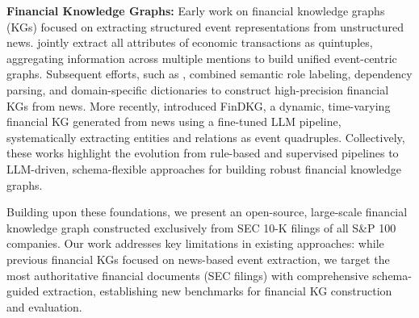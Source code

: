 \textbf{Financial Knowledge Graphs:}
Early work on financial knowledge graphs (KGs) focused on extracting structured event representations from unstructured news. \citet{benetka2017financial} jointly extract all attributes of economic transactions as quintuples, aggregating information across multiple mentions to build unified event-centric graphs. Subsequent efforts, such as \citet{elhammadi2020pipeline}, combined semantic role labeling, dependency parsing, and domain-specific dictionaries to construct high-precision financial KGs from news. More recently, \citet{li2024findkg} introduced FinDKG, a dynamic, time-varying financial KG generated from news using a fine-tuned LLM pipeline, systematically extracting entities and relations as event quadruples. Collectively, these works highlight the evolution from rule-based and supervised pipelines to LLM-driven, schema-flexible approaches for building robust financial knowledge graphs.

Building upon these foundations, we present an open-source, large-scale financial knowledge graph constructed exclusively from SEC 10-K filings of all S\&P 100 companies. Our work addresses key limitations in existing approaches: while previous financial KGs focused on news-based event extraction, we target the most authoritative financial documents (SEC filings) with comprehensive schema-guided extraction, establishing new benchmarks for financial KG construction and evaluation.

